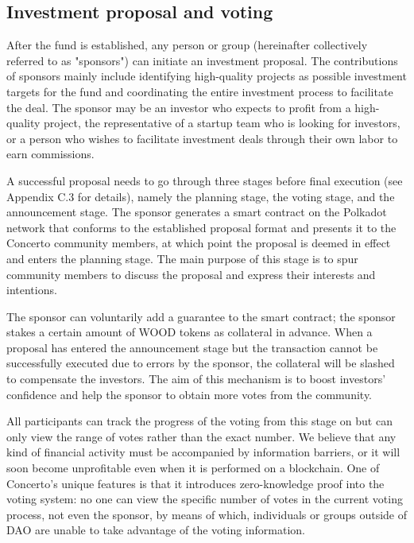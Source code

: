 \documentclass[UTF8]{article}
\begin{document}
\begin{multicols}{2}
\subsection{Investment proposal and voting}

After the fund is established, any person or group (hereinafter collectively referred to as "sponsors") can initiate an investment proposal. The contributions of sponsors mainly include identifying high-quality projects as possible investment targets for the fund and coordinating the entire investment process to facilitate the deal. The sponsor may be an investor who expects to profit from a high-quality project, the representative of a startup team who is looking for investors, or a person who wishes to facilitate investment deals through their own labor to earn commissions.

A successful proposal needs to go through three stages before final execution (see Appendix C.3 for details), namely the planning stage, the voting stage, and the announcement stage. The sponsor generates a smart contract on the Polkadot network that conforms to the established proposal format and presents it to the Concerto community members, at which point the proposal is deemed in effect and enters the planning stage. The main purpose of this stage is to spur community members to discuss the proposal and express their interests and intentions.

The sponsor can voluntarily add a guarantee to the smart contract; the sponsor stakes a certain amount of WOOD tokens as collateral in advance. When a proposal has entered the announcement stage but the transaction cannot be successfully executed due to errors by the sponsor, the collateral will be slashed to compensate the investors. The aim of this mechanism is to boost investors’ confidence and help the sponsor to obtain more votes from the community.


All participants can track the progress of the voting from this stage on but can only view the range of votes rather than the exact number. We believe that any kind of financial activity must be accompanied by information barriers, or it will soon become unprofitable even when it is performed on a blockchain. One of Concerto’s unique features is that it introduces zero-knowledge proof into the voting system: no one can view the specific number of votes in the current voting process, not even the sponsor, by means of which, individuals or groups outside of DAO are unable to take advantage of the voting information.


\end{multicols}
\end{document}
